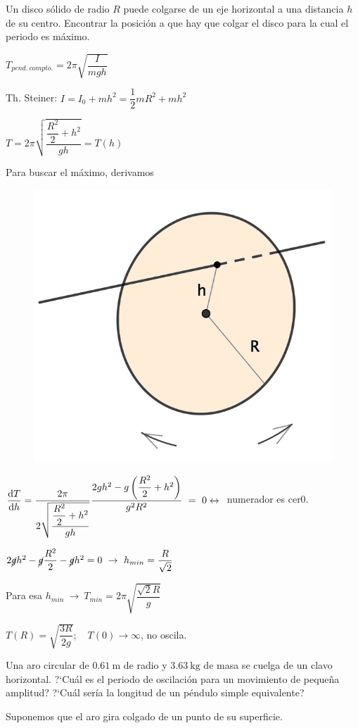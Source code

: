 \vspace{5mm}%
\begin{prob}
Un disco sólido de radio $R$ puede colgarse de un eje horizontal a una distancia $h$ de su centro.	Encontrar la posición a que hay que colgar el disco para la cual el periodo es máximo. 
\end{prob}
\begin{multicols}{2}
$T_{pend.\ compto.}=2\pi \sqrt{\dfrac{I}{mgh}}$

Th. Steiner: $I=I_0+mh^2=\dfrac 1 2 m R^2+mh^2$

$T=2\pi \sqrt{\dfrac{\dfrac {R^2}{2}+h^2}{gh}}=T(h)$

Para buscar el máximo, derivamos
\begin{figure}[H]
		\centering
		\includegraphics[width=.4\textwidth]{imagenes/imagenes21/T21IM09.png}
	\end{figure}	
\end{multicols}
$\displaystyle \dv{T}{h}=
\dfrac
{2\pi}
{2 \sqrt{ \dfrac{\dfrac {R^2}{2}+h^2}{gh}} } 
\dfrac{2gh^2-g \left( \dfrac{R^2}{2} + h^2 \right) } {g^2R^2} \ = \ 0 \leftrightarrow\ $ numerador es cer0.

$2\cancel{g}h^2-\cancel{g}\dfrac{R^2}{2}-\cancel{g}h^2=0 \ \to \ h_{min}=\dfrac{R}{\sqrt{2}}$

Para esa $h_{min} \ \to \ T_{min}=2\pi \sqrt{\dfrac{\sqrt{2}R}{g}}$

$T(R)=\sqrt{\dfrac{3R}{2g}}; \quad T(0)\to \infty$, no oscila.

\vspace{5mm}%
\begin{prob}
Una aro circular de $0.61\ \mathrm{m}$ de radio y $3.63\ \mathrm{kg}$ de masa se cuelga de un clavo horizontal. ?`Cuál es el periodo de oscilación para un movimiento de pequeña amplitud? ?`Cuál sería la longitud de un péndulo simple equivalente?	
\end{prob}

Suponemos que el aro gira colgado de un punto de su superficie.

